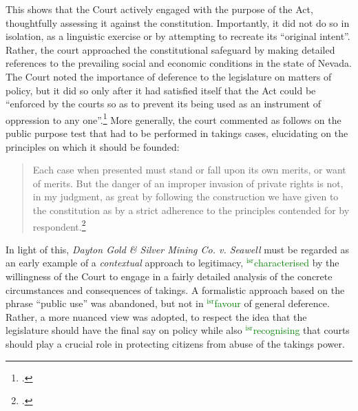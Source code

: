 \documentclass[12pt,a4paper]{book} %
\newcommand{\isr}[1]{\textcolor{green}{$^{\textrm{isr}}${#1}}}
\begin{document}
This shows that the Court actively engaged with the purpose of the Act, thoughtfully assessing it against the constitution. Importantly, it did not do so in isolation, as a linguistic exercise or by attempting to recreate its ``original intent''. Rather, the court approached the constitutional safeguard by making detailed references to the prevailing social and economic conditions in the state of Nevada. The Court noted the importance of deference to the legislature on matters of policy, but it did so only after it had satisfied itself that the Act could be ``enforced by the courts so as to prevent its being used as an instrument of oppression to any one''.\footcite[412]{seawell76} More generally, the court commented as follows on the public purpose test that had to be performed in takings cases, elucidating on the principles on which it should be founded:

\begin{quote}
 Each case when presented must stand or fall upon its own merits, or want of merits. But the danger of an improper invasion of private rights is not, in my judgment, as great by following the construction we have given to the constitution as by a strict adherence to the principles contended for by respondent.\footcite[398]{seawell76}
\end{quote}

In light of this, {\it Dayton Gold \& Silver Mining Co. v. Seawell} must be regarded as an early example of a {\it contextual} approach to legitimacy, \isr{characterised} by the willingness of the Court to engage in a fairly detailed analysis of the concrete circumstances and consequences of takings. A formalistic approach based on the phrase ``public use'' was abandoned, but not in \isr{favour} of general deference. Rather, a more nuanced view was adopted, to respect the idea that the legislature should have the final say on policy while also \isr{recognising} that courts should play a crucial role in protecting citizens from abuse of the takings power. 
\end{document}
